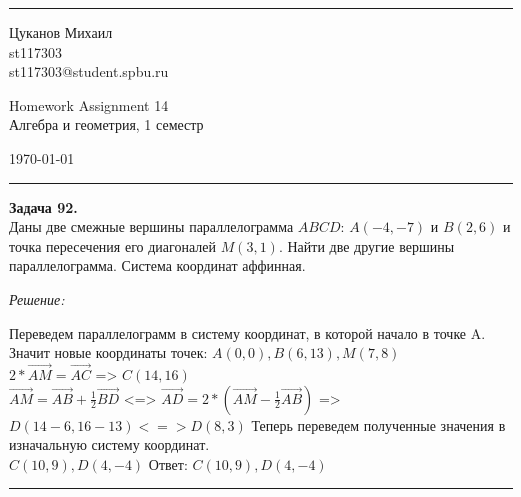 \documentclass[a4paper, 12pt]{article}
\newenvironment{problem}[2][Задача]
    { \begin{mdframed}[backgroundcolor=gray!10] \textbf{#1 #2.} \\}
    {  \end{mdframed}}
\newenvironment{solution}
    {\textit{Решение: }}
    {\noindent\rule{7in}{1.5pt}}
\begin{document}

\fancyhead[C]{}
\hrule \medskip %
\begin{minipage}{0.295\textwidth}
\raggedright\footnotesize
Цуканов Михаил \hfill\\
st117303 \hfill\\
st117303@student.spbu.ru
\end{minipage}
\begin{minipage}{0.4\textwidth}
\centering\large
Homework Assignment 14\\
\normalsize
Алгебра и геометрия, 1 семестр\\
\end{minipage}
\begin{minipage}{0.295\textwidth}
\raggedleft
\today\hfill\\
\end{minipage}
\medskip\hrule
\bigskip




\begin{problem}{92}
Даны две смежные вершины параллелограмма $ABCD$: $A(-4,-7)$ и $B(2,6)$ и точка пересечения его диагоналей $M(3,1)$.
Найти две другие вершины параллелограмма. Система координат аффинная.
\end{problem}
\begin{solution}

Переведем параллелограмм в систему координат, в которой начало в точке A. \\
Значит новые координаты точек: $A(0, 0), B(6, 13), M(7, 8)$ \\
$2*\vec{AM} = \vec{AC}$ => $C(14, 16)$ \\
$\vec{AM} = \vec{AB} + \frac{1}{2}\vec{BD}$ <=> $\vec{AD} = 2 *(\vec{AM} - \frac{1}{2}\vec{AB})$
=> $D(14 - 6, 16 - 13) <=> D(8, 3)$
Теперь переведем полученные значения в изначальную систему координат. \\
$C(10, 9), D(4, -4)$
Ответ: $C(10, 9), D(4, -4)$

\end{solution}
\end{document}
